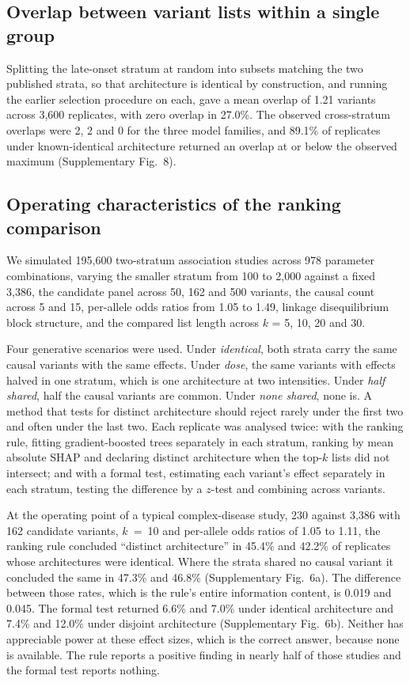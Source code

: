 \documentclass[10pt]{article}
\begin{document}
\subsection*{Overlap between variant lists within a single group}

Splitting the late-onset stratum at random into subsets matching the two published strata, so
that architecture is identical by construction, and running the earlier selection procedure on
each, gave a mean overlap of 1.21 variants across 3,600 replicates, with zero overlap in 27.0\%.
The observed cross-stratum overlaps were 2, 2 and 0 for the three model families, and 89.1\% of
replicates under known-identical architecture returned an overlap at or below the observed
maximum (Supplementary Fig.~8).

\subsection*{Operating characteristics of the ranking comparison}

We simulated 195,600 two-stratum association studies across 978 parameter combinations, varying
the smaller stratum from 100 to 2,000 against a fixed 3,386, the candidate panel across 50, 162
and 500 variants, the causal count across 5 and 15, per-allele odds ratios from 1.05 to 1.49,
linkage disequilibrium block structure, and the compared list length across $k$ = 5, 10, 20 and
30.

Four generative scenarios were used. Under \textit{identical}, both strata carry the same causal
variants with the same effects. Under \textit{dose}, the same variants with effects halved in one
stratum, which is one architecture at two intensities. Under \textit{half shared}, half the
causal variants are common. Under \textit{none shared}, none is. A method that tests for distinct
architecture should reject rarely under the first two and often under the last two. Each
replicate was analysed twice: with the ranking rule, fitting gradient-boosted trees separately in
each stratum, ranking by mean absolute SHAP and declaring distinct architecture when the top-$k$
lists did not intersect; and with a formal test, estimating each variant's effect separately in
each stratum, testing the difference by a $z$-test and combining across variants.

At the operating point of a typical complex-disease study, 230 against 3,386 with 162 candidate
variants, $k$~=~10 and per-allele odds ratios of 1.05 to 1.11, the ranking rule concluded
``distinct architecture'' in 45.4\% and 42.2\% of replicates whose architectures were identical.
Where the strata shared no causal variant it concluded the same in 47.3\% and 46.8\%
(Supplementary Fig.~6a). The difference between those rates, which is the rule's entire information content,
is 0.019 and 0.045. The formal test returned 6.6\% and 7.0\% under identical architecture and
7.4\% and 12.0\% under disjoint architecture (Supplementary Fig.~6b). Neither has appreciable power at these
effect sizes, which is the correct answer, because none is available. The rule reports a positive
finding in nearly half of those studies and the formal test reports nothing.
\end{document}
